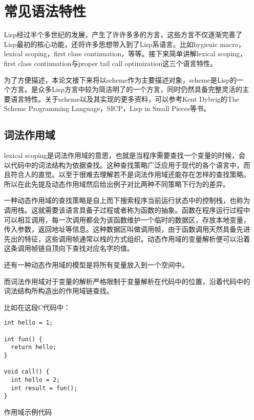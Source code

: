 %
%

{
    \let\centering\raggedright
    \chapter{常见语法特性}
    \label{ch:lang features}
    \thispagestyle{hubu@thesis}
}

Lisp经过半个多世纪的发展，产生了许许多多的方言，这些方言不仅逐渐完善了Lisp最初的核心功能，还将许多思想带入到了Lisp系语言。比如hygienic macro，lexical scoping，first class continuation，等等。接下来简单讲解lexical scoping，first class continuation与proper tail call optimization这三个语言特性。

为了方便描述，本论文接下来将以scheme作为主要描述对象，scheme是Lisp的一个方言。是众多Lisp方言中较为简洁明了的一个方言，同时仍然具备完整灵活的主要语言特性。关于scheme以及其实现的更多资料，可以参考Kent Dybvig的The Scheme Programming Language\cite{dybvig09scm}，SICP\cite{sicp}，Lisp in Small Pieces\cite{que03}等书。

\section{词法作用域}

lexical scoping是词法作用域的意思，也就是当程序需要查找一个变量的时候，会以代码中的词法结构为依据查找。这种查找策略广泛应用于现代的各个语言中，而且符合人的直觉。以至于很难去理解若不是词法作用域还能存在怎样的查找策略。所以在此先提及动态作用域然后给出例子对比两种不同策略下行为的差异。

一种动态作用域的查找策略是自上而下搜索程序当前运行状态中的控制栈，也称为调用栈。这就需要该语言具备子过程或者称为函数的抽象。函数在程序运行过程中可以相互调用，每一次调用都会为该函数维护一个临时的数据区，存放本地变量，传入参数，返回地址等信息。这种数据区叫做调用帧，由于函数调用天然具备先进先出的特征，这些调用帧通常以栈的方式组织。动态作用域的变量解析便可以沿着这条调用帧链自顶向下查找对应名字的值。

还有一种动态作用域的模型是将所有变量放入到一个空间中。

而词法作用域对于变量的解析严格限制于变量解析在代码中的位置，沿着代码中的词法结构所构造出的作用域链查找。

比如在这段C代码中：

\begin{code}
\begin{verbatim}
int hello = 1;

int fun() {
  return hello;
}

void call() {
  int hello = 2;
  int result = fun();
}
\end{verbatim}
\caption{作用域示例代码}
\end{code}


